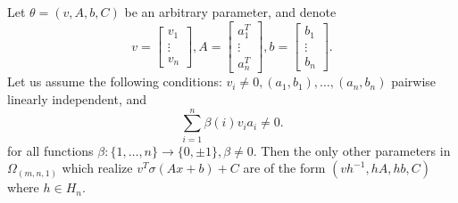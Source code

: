 \documentclass[11pt,letterpaper]{amsart}
\begin{document}
\begin{proposition}\label{prop:mn1genericity}
    Let $\theta=(v, A, b, C)$ be an arbitrary parameter, and denote
    $$
    v = \begin{bmatrix}
        v_1 \\ \vdots\\ v_n
    \end{bmatrix}, A = \begin{bmatrix}
        a_1^T\\ \vdots\\ a_n^T
    \end{bmatrix}, b = \begin{bmatrix}
        b_1 \\ \vdots\\ b_n
    \end{bmatrix}.
    $$
    Let us assume the following conditions: $v_i\neq 0, (a_1, b_1), \ldots, (a_n, b_n)$ pairwise linearly independent, and 
    $$
    \sum_{i=1}^n \beta(i)v_ia_i\neq 0.
    $$
    for all functions $\beta: \{1, \ldots, n\}\rightarrow \{0,  \pm1\}, \beta\neq 0$. Then the only other parameters in $\Omega_{(m,n,1)}$ which realize $v^T\sigma(Ax+b)+C$ are of the form $(vh^{-1}, hA, hb, C)$ where $h\in H_n$.
\end{proposition}
\end{document}
